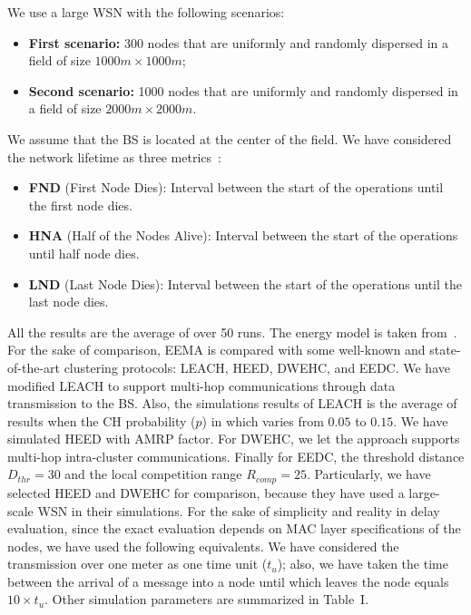 \documentclass[journal]{IEEEtran}
\begin{document}
We use a large WSN with the following scenarios:
\begin{itemize}
\item {\bf First scenario:}  300 nodes that are uniformly and randomly dispersed in a field of size $1000m \times 1000m$;

\item  {\bf Second scenario:} 1000 nodes that are uniformly and randomly dispersed in a field of size $2000m \times 2000m$.

\end{itemize}
We assume that the BS is located at the center of the field.  We have considered the network lifetime as three metrics~\cite{handy2002}:
\begin{itemize}
 
\item {\bf FND} (First Node Dies): Interval between the start of the operations until the first node dies.
\item {\bf HNA} (Half of the Nodes Alive): Interval between the start of the operations until half node dies.
\item {\bf LND} (Last Node Dies): Interval between the start of the operations until the last node dies.

\end{itemize}
 All the results are the average of over 50 runs.  The energy model is taken from~\cite{Heinzelman2002}.  For the sake of comparison, EEMA is compared with some well-known and state-of-the-art clustering protocols: LEACH, HEED, DWEHC, and EEDC.  We have modified LEACH to support multi-hop communications through data transmission to the BS.  Also, the simulations results of LEACH is the average of results when the CH probability ($p$) in which varies from $0.05$ to $0.15$.  We have simulated HEED with AMRP factor.  For DWEHC, we let the approach supports multi-hop intra-cluster communications.  Finally for EEDC, the threshold distance $D_{thr}=30$ and the local competition range $R_{comp}=25$.
 Particularly, we have selected HEED and DWEHC for comparison, because they have used a large-scale WSN in their simulations.  For the sake of simplicity and reality in delay evaluation, since the exact evaluation depends on MAC layer specifications of the nodes, we have used the following equivalents.  We have considered the transmission over one meter as one time unit ($t_u$); also, we have taken the time between the arrival of a message into a node until which leaves the node equals $10 \times t_u$.  Other simulation parameters are summarized in Table~I.
\end{document}
